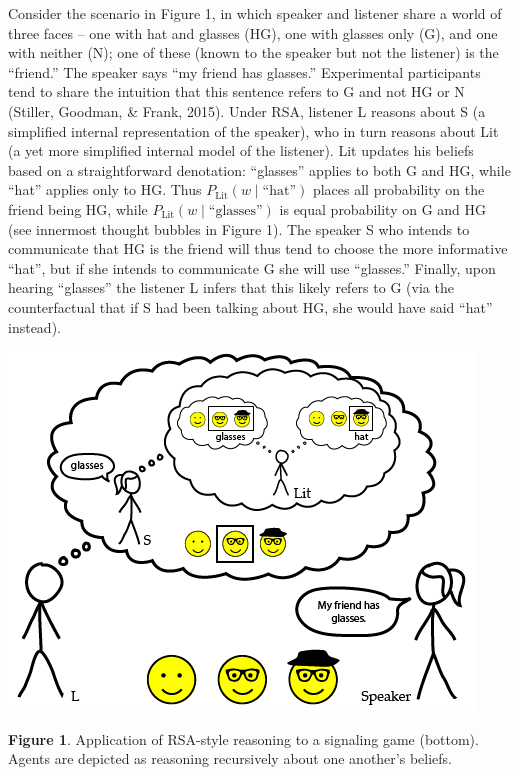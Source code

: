 \documentclass[]{elsarticle}
\begin{document}
Consider the scenario in Figure 1, in which speaker and listener share a
world of three faces -- one with hat and glasses (HG), one with glasses
only (G), and one with neither (N); one of these (known to the speaker
but not the listener) is the ``friend.'' The speaker says ``my friend
has glasses.'' Experimental participants tend to share the intuition
that this sentence refers to G and not HG or N (Stiller, Goodman, \&
Frank, 2015). Under RSA, listener L reasons about S (a simplified
internal representation of the speaker), who in turn reasons about Lit
(a yet more simplified internal model of the listener). Lit updates his
beliefs based on a straightforward denotation: ``glasses'' applies to
both G and HG, while ``hat'' applies only to HG. Thus
$P_{\text{Lit}}(w\mid \text{``hat''})$ places all probability on the friend
being HG, while $P_{\text{Lit}}(w\mid \text{``glasses''})$ is equal probability
on G and HG (see innermost thought bubbles in Figure 1). The speaker S
who intends to communicate that HG is the friend will thus tend to
choose the more informative ``hat'', but if she intends to communicate G
she will use ``glasses.'' Finally, upon hearing ``glasses'' the listener
L infers that this likely refers to G (via the counterfactual that if S
had been talking about HG, she would have said ``hat'' instead).

\includegraphics{images/media/image02.png}

\textbf{Figure 1}. Application of RSA-style reasoning to a signaling
game (bottom). Agents are depicted as reasoning recursively about one
another's beliefs.
\end{document}
